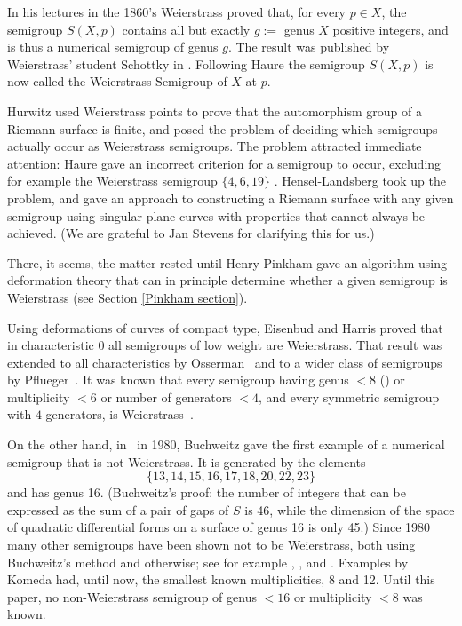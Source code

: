 \documentclass[twoside,12pt, leqno]{amsart}
\theoremstyle{definition}
\begin{document}
In his lectures in the 1860's Weierstrass proved that, for every $p\in X$, 
the semigroup $S(X,p)$ contains all but exactly
$g :=$ genus $X$ positive integers, and is thus a numerical semigroup of genus $g$.
The result was published by Weierstrass'  
student Schottky in \cite{schottky1877}. Following Haure \cite{MR1508928}
 the semigroup $S(X,p)$ is now called the Weierstrass
 Semigroup of $X$ at $p$.
 
Hurwitz \cite{MR1510753} used Weierstrass points to prove that the automorphism group of a Riemann surface is finite, and posed the problem of deciding
which semigroups actually occur as Weierstrass semigroups. The problem attracted immediate attention: Haure  gave an incorrect criterion
for a semigroup to occur, excluding for example  the Weierstrass semigroup $\{4,6,19\}$ \cite[p, 165]{MR1508928}. Hensel-Landsberg \cite[pp. 545--548]{MR192045} took
up the problem, and gave an approach to constructing a Riemann surface with any given
semigroup using singular plane curves with properties that cannot always be achieved. (We are grateful to Jan Stevens for clarifying
this for us.)

There, it seems, the matter rested until 
Henry Pinkham \cite{MR376672}
gave an algorithm using deformation theory that can in principle determine whether a given
semigroup is Weierstrass (see Section \ref{Pinkham section}). 

Using deformations of curves of compact type, Eisenbud and Harris \cite{MR874034} proved
that in characteristic 0 all semigroups of low weight are Weierstrass. That
 result was extended to all characteristics by Osserman~\cite{MR2266887}
and to a wider class of semigroups by Pflueger~\cite{MR3892968}.
It was known that every semigroup having genus $<8$
(\cite{MR1310748}) or multiplicity  $<6$ \cite{MR1174911} or number of
generators $<4$, and every symmetric semigroup with $4$ generators,  is Weierstrass~\cite{MR655415}.

On the other hand, in~\cite{BuchweitzThese} in 1980, Buchweitz gave the first example of a numerical semigroup that is not
Weierstrass. It is generated by the elements
$$
\{13, 14, 15, 16, 17, 18, 20, 22, 23\}
$$
and has genus 16. (Buchweitz's proof: the number of integers
that can be expressed as the sum of a pair of gaps of $S$ is
46, while the dimension of the  space of quadratic differential forms
on a surface of genus 16
is only 45.) Since 1980 many other semigroups have been shown not to
be Weierstrass, both using Buchweitz's method and otherwise; see for example 
  \cite{MR4332500}, \cite{zbMATH07431143}, and
 \cite{MR3010539}.
  Examples by Komeda \cite{MR3010539} had, until now, the
 smallest known multiplicities, 8 and 12.
Until this paper, no non-Weierstrass semigroup of genus $<16$ or multiplicity $<8$ was known.
\end{document}
